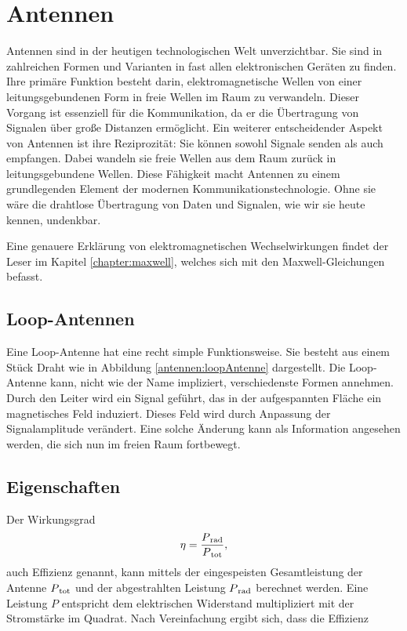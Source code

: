 %
%
% 
%
%

\section{Antennen\label{antennen:antennenAllgemein}}


Antennen sind in der heutigen technologischen Welt unverzichtbar. Sie sind in zahlreichen Formen und Varianten in fast allen elektronischen Geräten zu finden. Ihre primäre Funktion besteht darin, elektromagnetische Wellen von einer leitungsgebundenen Form in freie Wellen im Raum zu verwandeln. Dieser Vorgang ist essenziell für die Kommunikation, da er die Übertragung von Signalen über große Distanzen ermöglicht. Ein weiterer entscheidender Aspekt von Antennen ist ihre Reziprozität: Sie können sowohl Signale senden als auch empfangen. Dabei wandeln sie freie Wellen aus dem Raum zurück in leitungsgebundene Wellen. Diese Fähigkeit macht Antennen zu einem grundlegenden Element der modernen Kommunikationstechnologie. Ohne sie wäre die drahtlose Übertragung von Daten und Signalen, wie wir sie heute kennen, undenkbar.

Eine genauere Erklärung von elektromagnetischen Wechselwirkungen findet der Leser im Kapitel \ref{chapter:maxwell},
welches sich mit den Maxwell-Gleichungen befasst. 
\subsection{Loop-Antennen\label{antennen:antennenAllgemein_loop}}


Eine Loop-Antenne hat eine recht simple Funktionsweise. Sie besteht aus einem Stück Draht wie in Abbildung \ref{antennen:loopAntenne} dargestellt. Die Loop-Antenne kann, nicht wie der Name impliziert, verschiedenste Formen annehmen. Durch den Leiter wird ein Signal geführt, das in der aufgespannten Fläche ein magnetisches Feld induziert. Dieses Feld wird durch Anpassung der Signalamplitude verändert. Eine solche Änderung kann als Information angesehen werden, die sich nun im freien Raum fortbewegt.



\subsection{Eigenschaften\label{antennen:antennenEigenschaften}}
Der Wirkungsgrad
\begin{equation}
	\eta=\frac{P\textsubscript{rad}}{P\textsubscript{tot}},
	\label{antennen:Wirkungsgrad}
\end{equation}
auch Effizienz genannt, kann mittels der eingespeisten Gesamtleistung der Antenne $P\textsubscript{tot}$ und der abgestrahlten Leistung $P\textsubscript{rad}$ berechnet werden. Eine Leistung $P$ entspricht dem elektrischen Widerstand multipliziert mit der Stromstärke im Quadrat. Nach Vereinfachung ergibt sich, dass die Effizienz


